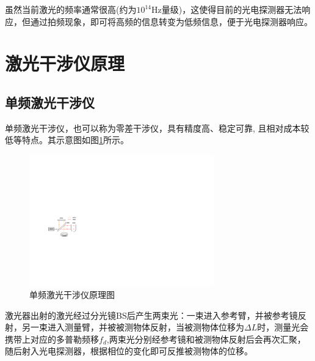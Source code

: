 虽然当前激光的频率通常很高(约为\(10^{14}\)Hz量级)，这使得目前的光电探测器无法响应\cite{张志平2022激光外差干涉技术在光刻机中的应用}，但通过拍频现象，即可将高频的信息转变为低频信息，便于光电探测器响应。

\section{激光干涉仪原理}
\subsection{单频激光干涉仪}
单频激光干涉仪，也可以称为零差干涉仪，具有精度高、稳定可靠, 且相对成本较低等特点\cite{零差干涉仪用于振动校准中关键技术的研究}。其示意图如图\ref{fig:单频激光干涉仪原理图}所示。
\begin{figure}[htb]
    \centering
    \includegraphics[width=8cm]{fig/2-fig/单频激光干涉仪原理图.drawio.pdf}
    \caption{单频激光干涉仪原理图}
    \label{fig:单频激光干涉仪原理图}
\end{figure}

激光器出射的激光经过分光镜BS后产生两束光：一束进入参考臂，并被参考镜反射，另一束进入测量臂，并被被测物体反射，当被测物体位移为\(\Delta L\)时，测量光会携带上对应的多普勒频移\(f_d\),两束光分别经参考镜和被测物体反射后会再次汇聚，随后射入光电探测器，根据相位的变化即可反推被测物体的位移。

